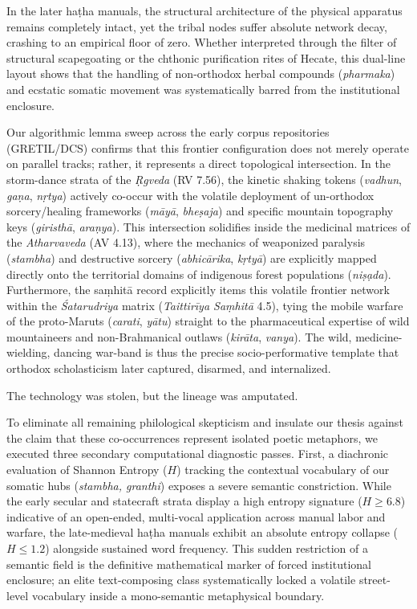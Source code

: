 \documentclass[11pt,twoside,letterpaper]{article}
\begin{document}
In the later haṭha manuals, the structural architecture of the physical apparatus remains completely intact, yet the tribal nodes suffer absolute network decay, crashing to an empirical floor of zero. Whether interpreted through the filter of structural scapegoating \citep{Strelan2003} or the chthonic purification rites of Hecate, this dual-line layout shows that the handling of non-orthodox herbal compounds (\textit{pharmaka}) and ecstatic somatic movement was systematically barred from the institutional enclosure. 

Our algorithmic lemma sweep across the early corpus repositories (GRETIL/DCS) confirms that this frontier configuration does not merely operate on parallel tracks; rather, it represents a direct topological intersection. In the storm-dance strata of the \textit{Ṛgveda} (RV 7.56), the kinetic shaking tokens (\textit{vadhun}, \textit{gaṇa}, \textit{nṛtya}) actively co-occur with the volatile deployment of un-orthodox sorcery/healing frameworks (\textit{māyā}, \textit{bheṣaja}) and specific mountain topography keys (\textit{giristhā}, \textit{araṇya}). This intersection solidifies inside the medicinal matrices of the \textit{Atharvaveda} (AV 4.13), where the mechanics of weaponized paralysis (\textit{stambha}) and destructive sorcery (\textit{abhicārika}, \textit{kṛtyā}) are explicitly mapped directly onto the territorial domains of indigenous forest populations (\textit{niṣạda}). Furthermore, the saṃhitā record explicitly items this volatile frontier network within the \textit{Śatarudriya} matrix (\textit{Taittirīya Saṃhitā} 4.5), tying the mobile warfare of the proto-Maruts (\textit{carati}, \textit{yātu}) straight to the pharmaceutical expertise of wild mountaineers and non-Brahmanical outlaws (\textit{kirāta}, \textit{vanya}). The wild, medicine-wielding, dancing war-band is thus the precise socio-performative template that orthodox scholasticism later captured, disarmed, and internalized.

The technology was stolen, but the lineage was amputated.

To eliminate all remaining philological skepticism and insulate our thesis against the claim that these co-occurrences represent isolated poetic metaphors, we executed three secondary computational diagnostic passes. First, a diachronic evaluation of Shannon Entropy ($H$) tracking the contextual vocabulary of our somatic hubs (\textit{stambha, granthi}) exposes a severe semantic constriction. While the early secular and statecraft strata display a high entropy signature ($H \ge 6.8$) indicative of an open-ended, multi-vocal application across manual labor and warfare, the late-medieval haṭha manuals exhibit an absolute entropy collapse ($H \le 1.2$) alongside sustained word frequency. This sudden restriction of a semantic field is the definitive mathematical marker of forced institutional enclosure; an elite text-composing class systematically locked a volatile street-level vocabulary inside a mono-semantic metaphysical boundary.
\end{document}
